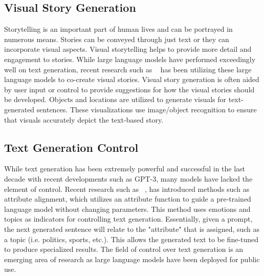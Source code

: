 \documentclass{article} %
\begin{document}
\subsection{Visual Story Generation}
Storytelling is an important part of human lives and can be portrayed in numerous means. Stories can be conveyed through just text or they can incorporate visual aspects. Visual storytelling helps to provide more detail and engagement to stories. While large language models have performed exceedingly well on text generation, recent research such as ~\cite{Chen_Li_Shi_Liu_Si_2023} has been utilizing these large language models to co-create visual stories. Visual story generation is often aided by user input or control to provide suggestions for how the visual stories should be developed. Objects and locations are utilized to generate visuals for text-generated sentences. These visualizations use image/object recognition to ensure that visuals accurately depict the text-based story.

\subsection{Text Generation Control}
While text generation has been extremely powerful and successful in the last decade with recent developments such as GPT-3, many models have lacked the element of control. Recent research such as ~\cite{Yu_Yu_Sagae_2021}, has introduced methods such as attribute alignment, which utilizes an attribute function to guide a pre-trained language model without changing parameters. This method uses emotions and topics as indicators for controlling text generation. Essentially, given a prompt, the next generated sentence will relate to the "attribute" that is assigned, such as a topic (i.e. politics, sports, etc.). This allows the generated text to be fine-tuned to produce specialized results. The field of control over text generation is an emerging area of research as large language models have been deployed for public use.
\end{document}
